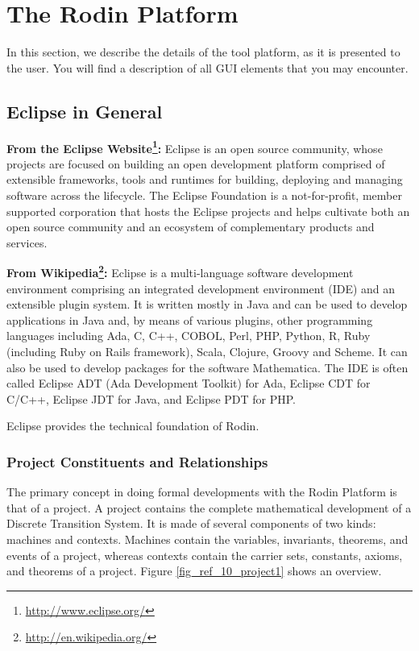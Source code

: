 \section{The Rodin Platform}
\label{rodin_platform}

In this section, we describe the details of the tool platform, as it is presented to the user.  You will find a description of all GUI elements that you may encounter.

\subsection{Eclipse in General}
\label{eclipse}

\textbf{From the Eclipse Website\footnote{\url{http://www.eclipse.org/}}:}
Eclipse is an open source community, whose projects are focused on building an open development platform comprised of extensible frameworks, tools and runtimes for building, deploying and managing software across the lifecycle. The Eclipse Foundation is a not-for-profit, member supported corporation that hosts the Eclipse projects and helps cultivate both an open source community and an ecosystem of complementary products and services.

\textbf{From Wikipedia\footnote{\url{http://en.wikipedia.org/}}:}
Eclipse is a multi-language software development environment comprising an integrated development environment (IDE) and an extensible plugin system. It is written mostly in Java and can be used to develop applications in Java and, by means of various plugins, other programming languages including Ada, C, C++, COBOL, Perl, PHP, Python, R, Ruby (including Ruby on Rails framework), Scala, Clojure, Groovy and Scheme. It can also be used to develop packages for the software Mathematica. The IDE is often called Eclipse ADT (Ada Development Toolkit) for Ada, Eclipse CDT for C/C++, Eclipse JDT for Java, and Eclipse PDT for PHP.

Eclipse provides the technical foundation of Rodin.

\subsubsection{Project Constituents and Relationships}
\label{project}

The primary concept in doing formal developments with the Rodin Platform is that of a project. A project contains the complete mathematical development of a Discrete Transition System. It is made of several components of two kinds: machines and contexts. Machines contain the variables, invariants, theorems, and events of a project, whereas contexts contain the carrier sets, constants, axioms, and theorems of a project. Figure \ref{fig_ref_10_project1} shows an overview.

